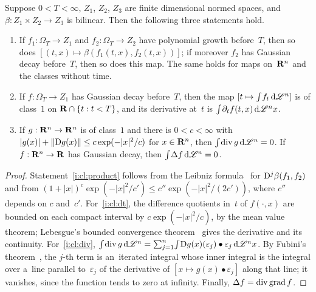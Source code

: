 \documentclass[a4paper,twoside,leqno]{article}
\begin{document}
\begin{lemma}
    \label{lem:classes}
    Suppose $0 < T < \infty$, $Z_1$, $Z_2$, $Z_3$ are finite dimensional normed spaces, and $\beta :
    Z_1 \times Z_2 \to Z_3$ is bilinear. Then the following three statements hold.
    \begin{enumerate}
        \item \label{i:cl:product} If $f_1 : \Omega_T \to Z_1$ and $f_2 : \Omega_T \to Z_2$ have
        polynomial growth before~$T$, then so does $[(t,x) \mapsto \beta(f_1(t,x),f_2(t,x))]$;
        if moreover $f_2$ has Gaussian decay before~$T$, then so does this map. The same holds
        for maps on~$\mathbf{R}^{n}$ and the classes without time.
        \item \label{i:cl:dt} If $f : \Omega_T \to Z_1$ has Gaussian decay before~$T$, then the
        map $[t \mapsto {\textstyle\int_{}^{}} f_t \,\mathrm{d} \mathscr{L}^{n}]$ is of class~$1$ on $\mathbf{R} \cap \{ t : t < T
        \}$, and its derivative at~$t$ is ${\textstyle\int_{}^{}} \partial_t f(t,x) \,\mathrm{d} \mathscr{L}^{n} x$.
        \item \label{i:cl:div} If $g : \mathbf{R}^{n} \to \mathbf{R}^{n}$ is of class~$1$ and there is $0 <
        c < \infty$ with $|g(x)| + \|\mathrm{D} g(x)\| \le c \exp(-|x|^2/c)$ for $x \in \mathbf{R}^{n}$,
        then ${\textstyle\int_{}^{}} \mathrm{div}\, g \,\mathrm{d} \mathscr{L}^{n} = 0$. If $f : \mathbf{R}^{n} \to \mathbf{R}$ has
        Gaussian decay, then ${\textstyle\int_{}^{}} \Delta f \,\mathrm{d} \mathscr{L}^{n} = 0$.
    \end{enumerate}
\end{lemma}

\begin{proof}
    Statement~\ref{i:cl:product} follows from the Leibniz formula~\cite[3.1.11]{Federer1969} for
    $\mathrm{D}^j \beta(f_1,f_2)$ and from $(1 + |x|)^c \exp(-|x|^2/c') \le c'' \exp(-|x|^2/(2c'))$,
    where $c''$ depends on $c$ and~$c'$. For~\ref{i:cl:dt}, the difference quotients in~$t$ of
    $f(\cdot,x)$ are bounded on each compact interval by $c \exp(-|x|^2/c)$, by the mean value
    theorem; Lebesgue's bounded convergence theorem~\cite[2.4.9]{Federer1969} gives the derivative
    and its continuity. For~\ref{i:cl:div}, ${\textstyle\int_{}^{}} \mathrm{div}\, g \,\mathrm{d} \mathscr{L}^{n} =
    {\textstyle\sum_{j=1}^{n}} {\textstyle\int_{}^{}} \mathrm{D} g(x)(\varepsilon_j) \bullet \varepsilon_j \,\mathrm{d}
    \mathscr{L}^{n} x$. By Fubini's theorem~\cite[2.6.2]{Federer1969}, the $j$-th term is an~iterated
    integral whose inner integral is the integral over a~line parallel to~$\varepsilon_j$ of the
    derivative of $[x \mapsto g(x) \bullet \varepsilon_j]$ along that line; it vanishes, since the
    function tends to zero at infinity. Finally, $\Delta f = \mathrm{div} \operatorname{grad} f$.
\end{proof}
\end{document}
